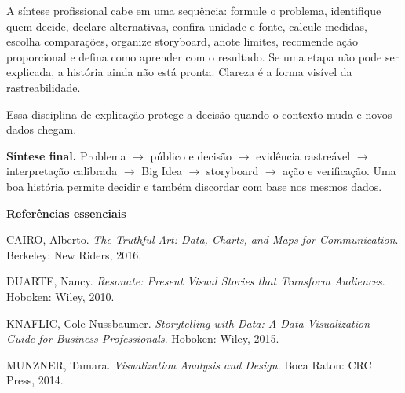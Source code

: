 A síntese profissional cabe em uma sequência: formule o problema, identifique quem decide, declare alternativas, confira unidade e fonte, calcule medidas, escolha comparações, organize storyboard, anote limites, recomende ação proporcional e defina como aprender com o resultado. Se uma etapa não pode ser explicada, a história ainda não está pronta. Clareza é a forma visível da rastreabilidade.

Essa disciplina de explicação protege a decisão quando o contexto muda e novos dados chegam.

\begin{SummaryBox}
\textbf{Síntese final.} Problema $\rightarrow$ público e decisão $\rightarrow$ evidência rastreável $\rightarrow$ interpretação calibrada $\rightarrow$ Big Idea $\rightarrow$ storyboard $\rightarrow$ ação e verificação. Uma boa história permite decidir e também discordar com base nos mesmos dados.
\end{SummaryBox}

\bigskip
\noindent\textbf{Referências essenciais}

\begingroup\small

CAIRO, Alberto. \textit{The Truthful Art: Data, Charts, and Maps for Communication}. Berkeley: New Riders, 2016.

DUARTE, Nancy. \textit{Resonate: Present Visual Stories that Transform Audiences}. Hoboken: Wiley, 2010.

KNAFLIC, Cole Nussbaumer. \textit{Storytelling with Data: A Data Visualization Guide for Business Professionals}. Hoboken: Wiley, 2015.

MUNZNER, Tamara. \textit{Visualization Analysis and Design}. Boca Raton: CRC Press, 2014.

\endgroup
